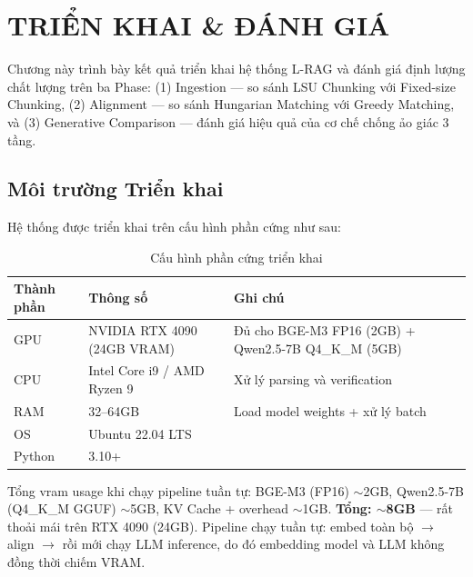 \chapter{TRIỂN KHAI \& ĐÁNH GIÁ}

Chương này trình bày kết quả triển khai hệ thống L-RAG và đánh giá định lượng chất lượng trên ba Phase: (1) Ingestion — so sánh LSU Chunking với Fixed-size Chunking, (2) Alignment — so sánh Hungarian Matching với Greedy Matching, và (3) Generative Comparison — đánh giá hiệu quả của cơ chế chống ảo giác 3 tầng.

\section{Môi trường Triển khai}

Hệ thống được triển khai trên cấu hình phần cứng như sau:

\begin{table}[H]
    \centering
    \caption{Cấu hình phần cứng triển khai}
    \label{tab:hardware}
    \begin{tabularx}{\textwidth}{l X X}
        \toprule
        \textbf{Thành phần} & \textbf{Thông số} & \textbf{Ghi chú}\\
        \midrule
        GPU & NVIDIA RTX 4090 (24GB VRAM) & Đủ cho BGE-M3 FP16 (2GB) + Qwen2.5-7B Q4\_K\_M (5GB)\\
        CPU & Intel Core i9 / AMD Ryzen 9 & Xử lý parsing và verification\\
        RAM & 32--64GB & Load model weights + xử lý batch\\
        OS & Ubuntu 22.04 LTS & \\
        Python & 3.10+ & \\
        \bottomrule
    \end{tabularx}
\end{table}

Tổng \gls{vram} usage khi chạy pipeline tuần tự: BGE-M3 (FP16) $\sim$2GB, Qwen2.5-7B (Q4\_K\_M GGUF) $\sim$5GB, KV Cache + overhead $\sim$1GB. \textbf{Tổng: $\sim$8GB} — rất thoải mái trên RTX 4090 (24GB). Pipeline chạy tuần tự: embed toàn bộ $\rightarrow$ align $\rightarrow$ rồi mới chạy LLM inference, do đó embedding model và LLM không đồng thời chiếm VRAM.

